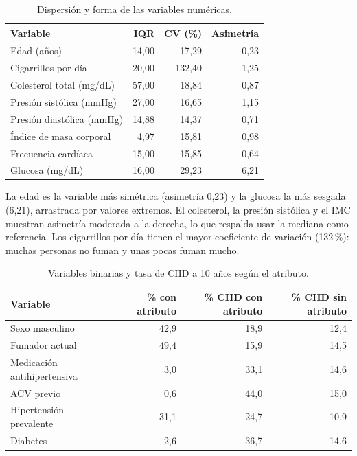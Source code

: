 \documentclass[11pt,a4paper]{article}
\begin{document}
\begin{table}[H]
\centering
\caption{Dispersión y forma de las variables numéricas.}
\label{tab:dispersion}
\begin{tabular}{lrrr}
\toprule
\textbf{Variable} & \textbf{IQR} & \textbf{CV (\%)} & \textbf{Asimetría} \\
\midrule
Edad (años)               & 14{,}00 & 17{,}29  & 0{,}23 \\
Cigarrillos por día       & 20{,}00 & 132{,}40 & 1{,}25 \\
Colesterol total (mg/dL)  & 57{,}00 & 18{,}84  & 0{,}87 \\
Presión sistólica (mmHg)  & 27{,}00 & 16{,}65  & 1{,}15 \\
Presión diastólica (mmHg) & 14{,}88 & 14{,}37  & 0{,}71 \\
Índice de masa corporal   & 4{,}97  & 15{,}81  & 0{,}98 \\
Frecuencia cardíaca       & 15{,}00 & 15{,}85  & 0{,}64 \\
Glucosa (mg/dL)           & 16{,}00 & 29{,}23  & 6{,}21 \\
\bottomrule
\end{tabular}
\end{table}

La edad es la variable más simétrica (asimetría 0{,}23) y la glucosa la más sesgada (6{,}21), arrastrada
por valores extremos. El colesterol, la presión sistólica y el IMC muestran asimetría moderada a la
derecha, lo que respalda usar la mediana como referencia. Los cigarrillos por día tienen el mayor
coeficiente de variación (132\,\%): muchas personas no fuman y unas pocas fuman mucho.

\begin{table}[H]
\centering
\caption{Variables binarias y tasa de CHD a 10 años según el atributo.}
\label{tab:binarias}
\begin{tabular}{lrrr}
\toprule
\textbf{Variable} & \textbf{\% con atributo} & \textbf{\% CHD con atributo} & \textbf{\% CHD sin atributo} \\
\midrule
Sexo masculino                & 42{,}9 & 18{,}9 & 12{,}4 \\
Fumador actual                & 49{,}4 & 15{,}9 & 14{,}5 \\
Medicación antihipertensiva   & 3{,}0  & 33{,}1 & 14{,}6 \\
ACV previo                    & 0{,}6  & 44{,}0 & 15{,}0 \\
Hipertensión prevalente       & 31{,}1 & 24{,}7 & 10{,}9 \\
Diabetes                      & 2{,}6  & 36{,}7 & 14{,}6 \\
\bottomrule
\end{tabular}
\end{table}
\end{document}
